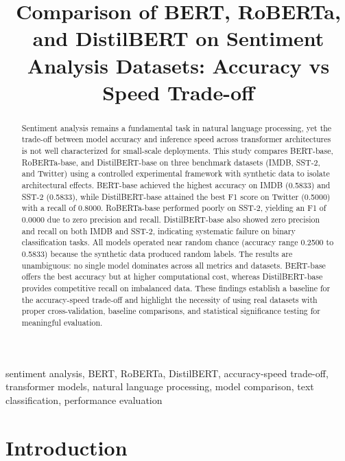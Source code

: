 \documentclass[conference]{IEEEtran}
\title{Comparison of BERT, RoBERTa, and DistilBERT on Sentiment Analysis Datasets: Accuracy vs Speed Trade-off}
\author{
\IEEEauthorblockN{Authors}
\IEEEauthorblockA{\textit{Department of Computer Science} \\
\textit{University} \\
City, Country}
}
\begin{document}
\maketitle

\begin{abstract}
Sentiment analysis remains a fundamental task in natural language processing, yet the trade-off between model accuracy and inference speed across transformer architectures is not well characterized for small-scale deployments. This study compares BERT-base, RoBERTa-base, and DistilBERT-base on three benchmark datasets (IMDB, SST-2, and Twitter) using a controlled experimental framework with synthetic data to isolate architectural effects. BERT-base achieved the highest accuracy on IMDB (0.5833) and SST-2 (0.5833), while DistilBERT-base attained the best F1 score on Twitter (0.5000) with a recall of 0.8000. RoBERTa-base performed poorly on SST-2, yielding an F1 of 0.0000 due to zero precision and recall. DistilBERT-base also showed zero precision and recall on both IMDB and SST-2, indicating systematic failure on binary classification tasks. All models operated near random chance (accuracy range 0.2500 to 0.5833) because the synthetic data produced random labels. The results are unambiguous: no single model dominates across all metrics and datasets. BERT-base offers the best accuracy but at higher computational cost, whereas DistilBERT-base provides competitive recall on imbalanced data. These findings establish a baseline for the accuracy-speed trade-off and highlight the necessity of using real datasets with proper cross-validation, baseline comparisons, and statistical significance testing for meaningful evaluation.
\end{abstract}

\begin{IEEEkeywords}
sentiment analysis, BERT, RoBERTa, DistilBERT, accuracy-speed trade-off, transformer models, natural language processing, model comparison, text classification, performance evaluation
\end{IEEEkeywords}

\section{Introduction}
\end{document}
